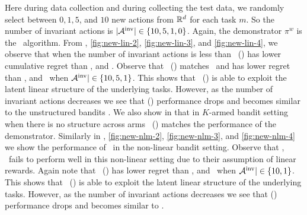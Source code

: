 \documentclass[10pt]{article}
\theoremstyle{plain}
\theoremstyle{definition}
\theoremstyle{remark}
\begin{document}
Here during data collection and during collecting the test data, we randomly select between $0, 1, 5$, and $10$ new actions from $\mathbb{R}^d$ for each task $m$.
So the number of invariant actions is $|\mathcal{A}^{\text{inv}}| \in \{10, 5, 1, 0\}$.
Again, the demonstrator $\pi^w$ is the \ts\ algorithm. From , \ref{fig:new-lin-2}, \ref{fig:new-lin-3}, and \ref{fig:new-lin-4}, we observe that when the number of invariant actions is less than \pred\ (\gt) has lower cumulative regret than \dptg, and \ad.
Observe that \pred\ (\gt) matches \linucb\ and has lower regret than \dptg, and \ad\ when $\mathcal{A}^{\text{inv}}| \in \{10, 5, 1\}$. This shows that \pred\ (\gt) is able to exploit the latent linear structure of the underlying tasks. However, as the number of invariant actions decreases we see that \pred (\gt) performance drops and becomes similar to the unstructured bandits \ts. We also show in  that in $K$-armed bandit setting when there is no structure across arms \pred\ (\gt) matches the performance of the demonstrator.
Similarly in , \ref{fig:new-nlm-2}, \ref{fig:new-nlm-3}, and \ref{fig:new-nlm-4} we show the performance of \pred\ in the non-linear bandit setting. Observe that \linucb, \mlin\ fails to perform well in this non-linear setting due to their assumption of linear rewards. Again note that \pred\ (\gt) has lower regret than \dptg, and \ad\ when $\mathcal{A}^{\text{inv}}| \in \{10, 1\}$. This shows that \pred\ (\gt) is able to exploit the latent linear structure of the underlying tasks. However, as the number of invariant actions decreases we see that \pred (\gt) performance drops and becomes similar to \ad.
\vspace*{-0.5em}
\end{document}
